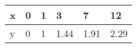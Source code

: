 \documentclass{article}
\begin{document}
\begin{table}[h!]
\begin{tabular}{l|l|l|l|l|l}

\multicolumn{1}{p{30.865313pt}}{\raggedright x} & \multicolumn{1}{|p{31.618126pt}}{\raggedright 0} & \multicolumn{1}{|p{31.618126pt}}{\raggedright 1} & \multicolumn{1}{|p{33.876564pt}}{\raggedright 3} & \multicolumn{1}{|p{37.640625pt}}{\raggedright 7} & \multicolumn{1}{|p{33.876564pt}}{\raggedright 12}\\ 
\hline 
\multicolumn{1}{p{30.865313pt}}{\raggedright y} & \multicolumn{1}{|p{31.618126pt}}{\raggedright 0} & \multicolumn{1}{|p{31.618126pt}}{\raggedright 1} & \multicolumn{1}{|p{33.876564pt}}{\raggedright 1.44} & \multicolumn{1}{|p{37.640625pt}}{\raggedright 1.91} & \multicolumn{1}{|p{33.876564pt}}{\raggedright 2.29}\\ 


\end{tabular}
\end{table}
\end{document}
